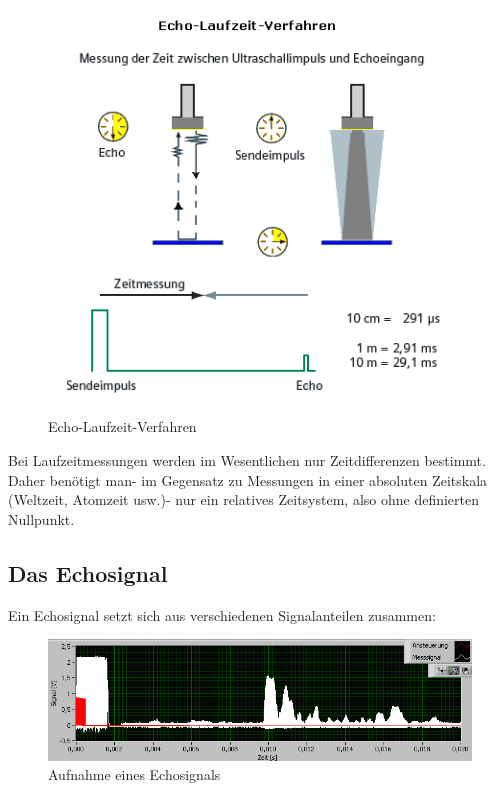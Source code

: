\begin{figure}[H]
	\centering
	\includegraphics[scale=0.8]{images/Echo-Laufzeit-Verfahren.png}
	\caption{Echo-Laufzeit-Verfahren\footnotemark}
\end{figure}

Bei Laufzeitmessungen werden im Wesentlichen nur Zeitdifferenzen bestimmt. Daher benötigt man- im Gegensatz zu Messungen in einer absoluten Zeitskala (Weltzeit, Atomzeit usw.)- nur ein relatives Zeitsystem, also ohne definierten Nullpunkt.

\subsection{Das Echosignal}
Ein Echosignal setzt sich aus verschiedenen Signalanteilen zusammen:
\begin{figure}[H]
	\centering
	\includegraphics[scale=0.6]{images/echosignal.png}
	\caption{Aufnahme eines Echosignals\footnotemark}
\end{figure}

